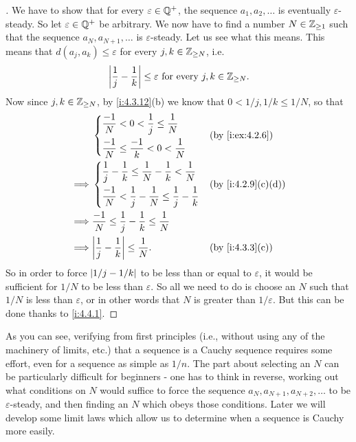 \begin{proof}[]
  We have to show that for every \(\varepsilon \in \mathbb{Q}^+\), the sequence \(a_1, a_2, \dots\) is eventually \(\varepsilon\)-steady.
  So let \(\varepsilon \in \mathbb{Q}^+\) be arbitrary.
  We now have to find a number \(N \in \mathbb{Z}_{\geq 1}\) such that the sequence \(a_N, a_{N + 1}, \dots\) is \(\varepsilon\)-steady.
  Let us see what this means.
  This means that \(d(a_j, a_k) \leq \varepsilon\) for every \(j, k \in \mathbb{Z}_{\geq N}\), i.e.
  \[
    \left\lvert\dfrac{1}{j} - \dfrac{1}{k}\right\rvert \leq \varepsilon \text{ for every } j, k \in \mathbb{Z}_{\geq N}.
  \]
  Now since \(j, k \in \mathbb{Z}_{\geq N}\), by \cref{i:4.3.12}(b) we know that \(0 < 1 / j, 1 / k \leq 1 / N\), so that
  \begin{align*}
             & \begin{dcases}
                 \dfrac{-1}{N} < 0 < \dfrac{1}{j} \leq \dfrac{1}{N}  \\
                 \dfrac{-1}{N} \leq \dfrac{-1}{k} < 0 < \dfrac{1}{N} \\
               \end{dcases}                         &  & \by{i:ex:4.2.6}                                           \\
    \implies & \begin{dcases}
                 \dfrac{1}{j} - \dfrac{1}{k} \leq \dfrac{1}{N} - \dfrac{1}{k} < \dfrac{1}{N} \\
                 \dfrac{-1}{N} < \dfrac{1}{j} - \dfrac{1}{N} \leq \dfrac{1}{j} - \dfrac{1}{k}
               \end{dcases} &  & \by{i:4.2.9}[c,d]                         \\
    \implies & \dfrac{-1}{N} \leq \dfrac{1}{j} - \dfrac{1}{k} \leq \dfrac{1}{N}                                    \\
    \implies & \abs{\dfrac{1}{j} - \dfrac{1}{k}} \leq \dfrac{1}{N}.                           &  & \by{i:4.3.3}[c]
  \end{align*}
  So in order to force \(\left\lvert1 / j - 1 / k\right\rvert\) to be less than or equal to \(\varepsilon\), it would be sufficient for \(1 / N\) to be less than \(\varepsilon\).
  So all we need to do is choose an \(N\) such that \(1 / N\) is less than \(\varepsilon\), or in other words that \(N\) is greater than \(1 / \varepsilon\).
  But this can be done thanks to \cref{i:4.4.1}.
\end{proof}

\begin{note}
  As you can see, verifying from first principles (i.e., without using any of the machinery of limits, etc.) that a sequence is a Cauchy sequence requires some effort, even for a sequence as simple as \(1 / n\).
  The part about selecting an \(N\) can be particularly difficult for beginners
  - one has to think in reverse, working out what conditions on \(N\) would suffice to force the sequence \(a_N, a_{N + 1}, a_{N + 2}, \dots\) to be \(\varepsilon\)-steady, and then finding an \(N\) which obeys those conditions.
  Later we will develop some limit laws which allow us to determine when a sequence is Cauchy more easily.
\end{note}

